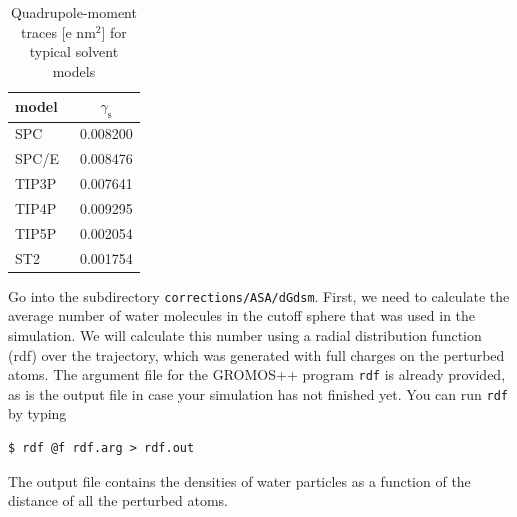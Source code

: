 \begin{table}[h]
  \center
  \caption{ Quadrupole-moment traces [e nm$^2$] for typical solvent models}
  \label{tab:quadrupole_moments}
  \begin{tabular}{ l  c  }
    \hline
    \textbf{model} & $\gamma_{\text{s}}$ \\ 
    \hline
    SPC~\cite{Berendsen1981} & 0.008200 \\
    SPC/E~\cite{Berendsen1987} & 0.008476 \\
    TIP3P~\cite{Jorgensen1983} & 0.007641 \\
    TIP4P~\cite{Jorgensen1983} & 0.009295 \\
    TIP5P~\cite{Mahoney2000} & 0.002054 \\
    ST2~\cite{Stillinger1974} & 0.001754 \\
    \hline
  \end{tabular}
\end{table}
%
Go into the subdirectory \texttt{corrections/ASA/dGdsm}. First, we need
to calculate the average number of water molecules in the cutoff
sphere that was used in the simulation. We will calculate this number
using a radial distribution function (rdf) over the trajectory, which
was generated with full charges on the perturbed atoms. The argument
file for the GROMOS++ program \texttt{rdf} is already provided, 
as is the output file in case your simulation has not finished yet.
You can run \texttt{rdf} by typing
\begin{lstlisting}
$ rdf @f rdf.arg > rdf.out 
\end{lstlisting}
The output file contains the densities of water particles as a function of
the distance of all the perturbed atoms. 
